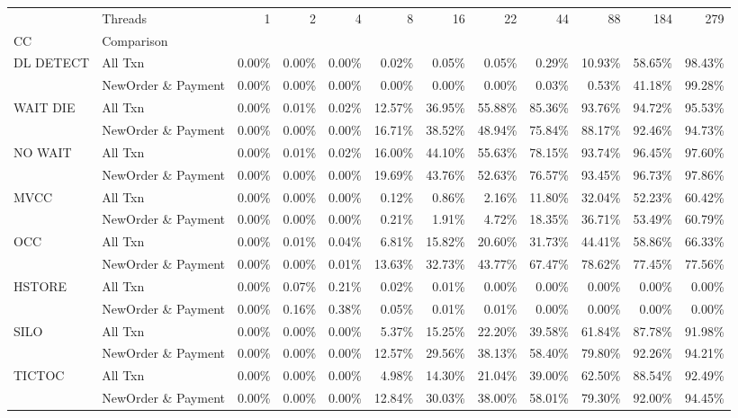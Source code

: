 \begin{tabular}{llrrrrrrrrrr}
\toprule
       & Threads &   1   &   2   &   4   &    8   &    16  &    22  &    44  &    88  &    184 &    279 \\
CC & Comparison &       &       &       &        &        &        &        &        &        &        \\
\midrule
DL DETECT & All Txn & 0.00\% & 0.00\% & 0.00\% &  0.02\% &  0.05\% &  0.05\% &  0.29\% & 10.93\% & 58.65\% & 98.43\% \\
       & NewOrder \& Payment & 0.00\% & 0.00\% & 0.00\% &  0.00\% &  0.00\% &  0.00\% &  0.03\% &  0.53\% & 41.18\% & 99.28\% \\
WAIT DIE & All Txn & 0.00\% & 0.01\% & 0.02\% & 12.57\% & 36.95\% & 55.88\% & 85.36\% & 93.76\% & 94.72\% & 95.53\% \\
       & NewOrder \& Payment & 0.00\% & 0.00\% & 0.00\% & 16.71\% & 38.52\% & 48.94\% & 75.84\% & 88.17\% & 92.46\% & 94.73\% \\
NO WAIT & All Txn & 0.00\% & 0.01\% & 0.02\% & 16.00\% & 44.10\% & 55.63\% & 78.15\% & 93.74\% & 96.45\% & 97.60\% \\
       & NewOrder \& Payment & 0.00\% & 0.00\% & 0.00\% & 19.69\% & 43.76\% & 52.63\% & 76.57\% & 93.45\% & 96.73\% & 97.86\% \\
MVCC & All Txn & 0.00\% & 0.00\% & 0.00\% &  0.12\% &  0.86\% &  2.16\% & 11.80\% & 32.04\% & 52.23\% & 60.42\% \\
       & NewOrder \& Payment & 0.00\% & 0.00\% & 0.00\% &  0.21\% &  1.91\% &  4.72\% & 18.35\% & 36.71\% & 53.49\% & 60.79\% \\
OCC & All Txn & 0.00\% & 0.01\% & 0.04\% &  6.81\% & 15.82\% & 20.60\% & 31.73\% & 44.41\% & 58.86\% & 66.33\% \\
       & NewOrder \& Payment & 0.00\% & 0.00\% & 0.01\% & 13.63\% & 32.73\% & 43.77\% & 67.47\% & 78.62\% & 77.45\% & 77.56\% \\
HSTORE & All Txn & 0.00\% & 0.07\% & 0.21\% &  0.02\% &  0.01\% &  0.00\% &  0.00\% &  0.00\% &  0.00\% &  0.00\% \\
       & NewOrder \& Payment & 0.00\% & 0.16\% & 0.38\% &  0.05\% &  0.01\% &  0.01\% &  0.00\% &  0.00\% &  0.00\% &  0.00\% \\
SILO & All Txn & 0.00\% & 0.00\% & 0.00\% &  5.37\% & 15.25\% & 22.20\% & 39.58\% & 61.84\% & 87.78\% & 91.98\% \\
       & NewOrder \& Payment & 0.00\% & 0.00\% & 0.00\% & 12.57\% & 29.56\% & 38.13\% & 58.40\% & 79.80\% & 92.26\% & 94.21\% \\
TICTOC & All Txn & 0.00\% & 0.00\% & 0.00\% &  4.98\% & 14.30\% & 21.04\% & 39.00\% & 62.50\% & 88.54\% & 92.49\% \\
       & NewOrder \& Payment & 0.00\% & 0.00\% & 0.00\% & 12.84\% & 30.03\% & 38.00\% & 58.01\% & 79.30\% & 92.00\% & 94.45\% \\
\bottomrule
\end{tabular}

